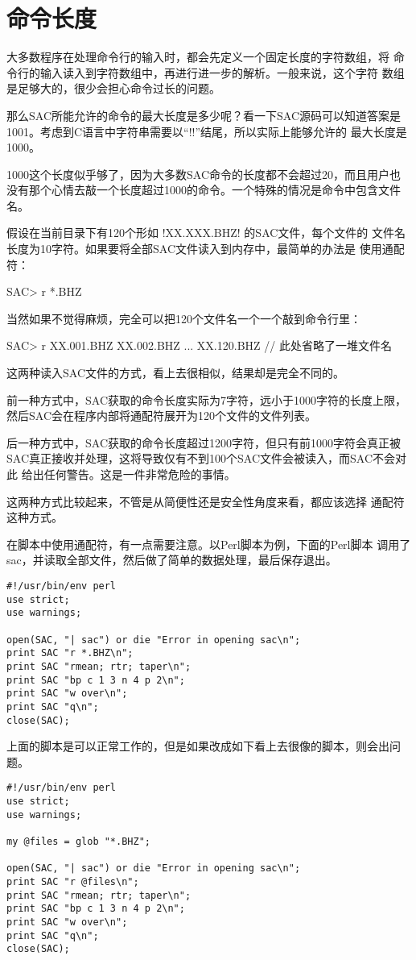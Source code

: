 \section{命令长度}
大多数程序在处理命令行的输入时，都会先定义一个固定长度的字符数组，将
命令行的输入读入到字符数组中，再进行进一步的解析。一般来说，这个字符
数组是足够大的，很少会担心命令过长的问题。

那么SAC所能允许的命令的最大长度是多少呢？看一下SAC源码可以知道答案是
1001。考虑到C语言中字符串需要以``!\0!''结尾，所以实际上能够允许的
最大长度是1000。

1000这个长度似乎够了，因为大多数SAC命令的长度都不会超过20，而且用户也
没有那个心情去敲一个长度超过1000的命令。一个特殊的情况是命令中包含文件名。

假设在当前目录下有120个形如 !XX.XXX.BHZ! 的SAC文件，每个文件的
文件名长度为10字符。如果要将全部SAC文件读入到内存中，最简单的办法是
使用通配符：
\begin{SACCode}
SAC> r *.BHZ
\end{SACCode}
当然如果不觉得麻烦，完全可以把120个文件名一个一个敲到命令行里：
\begin{SACCode}
SAC> r XX.001.BHZ XX.002.BHZ ... XX.120.BHZ // 此处省略了一堆文件名
\end{SACCode}

这两种读入SAC文件的方式，看上去很相似，结果却是完全不同的。

前一种方式中，SAC获取的命令长度实际为7字符，远小于1000字符的长度上限，
然后SAC会在程序内部将通配符展开为120个文件的文件列表。

后一种方式中，SAC获取的命令长度超过1200字符，但只有前1000字符会真正被
SAC真正接收并处理，这将导致仅有不到100个SAC文件会被读入，而SAC不会对此
给出任何警告。这是一件非常危险的事情。

这两种方式比较起来，不管是从简便性还是安全性角度来看，都应该选择
通配符这种方式。

在脚本中使用通配符，有一点需要注意。以Perl脚本为例，下面的Perl脚本
调用了sac，并读取全部文件，然后做了简单的数据处理，最后保存退出。

\begin{verbatim}
#!/usr/bin/env perl
use strict;
use warnings;

open(SAC, "| sac") or die "Error in opening sac\n";
print SAC "r *.BHZ\n";
print SAC "rmean; rtr; taper\n";
print SAC "bp c 1 3 n 4 p 2\n";
print SAC "w over\n";
print SAC "q\n";
close(SAC);
\end{verbatim}

上面的脚本是可以正常工作的，但是如果改成如下看上去很像的脚本，则会出问题。
\begin{verbatim}
#!/usr/bin/env perl
use strict;
use warnings;

my @files = glob "*.BHZ";

open(SAC, "| sac") or die "Error in opening sac\n";
print SAC "r @files\n";
print SAC "rmean; rtr; taper\n";
print SAC "bp c 1 3 n 4 p 2\n";
print SAC "w over\n";
print SAC "q\n";
close(SAC);
\end{verbatim}


